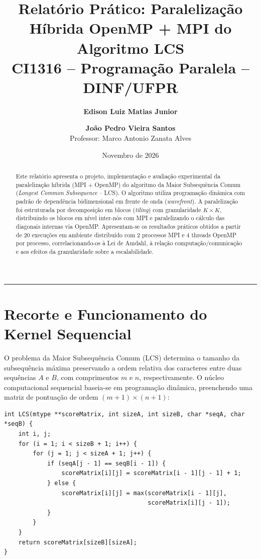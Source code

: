 \documentclass[12pt,a4paper]{article}
\title{\textbf{Relatório Prático: Paralelização Híbrida OpenMP + MPI do Algoritmo LCS}\\[0.5ex]
\large CI1316 -- Programação Paralela -- DINF/UFPR}
\author{\textbf{Edison Luiz Matias Junior} \and \textbf{João Pedro Vieira Santos}\\[1ex]
\small Professor: Marco Antonio Zanata Alves}
\date{Novembro de 2026}
\begin{document}
\maketitle

\begin{abstract}
Este relatório apresenta o projeto, implementação e avaliação experimental da paralelização híbrida (MPI + OpenMP) do algoritmo da Maior Subsequência Comum (\textit{Longest Common Subsequence} -- LCS). O algoritmo utiliza programação dinâmica com padrão de dependência bidimensional em frente de onda (\textit{wavefront}). A paralelização foi estruturada por decomposição em blocos (\textit{tiling}) com granularidade $K \times K$, distribuindo os blocos em nível inter-nós com MPI e paralelizando o cálculo das diagonais internas via OpenMP. Apresentam-se os resultados práticos obtidos a partir de 20 execuções em ambiente distribuído com 2 processos MPI e 4 threads OpenMP por processo, correlacionando-os à Lei de Amdahl, à relação computação/comunicação e aos efeitos da granularidade sobre a escalabilidade.
\end{abstract}

\vspace{0.5cm}
\hrule
\vspace{0.5cm}

\section{Recorte e Funcionamento do Kernel Sequencial}

O problema da Maior Subsequência Comum (LCS) determina o tamanho da subsequência máxima preservando a ordem relativa dos caracteres entre duas sequências $A$ e $B$, com comprimentos $m$ e $n$, respectivamente. O núcleo computacional sequencial baseia-se em programação dinâmica, preenchendo uma matriz de pontuação de ordem $(m+1) \times (n+1)$:

\begin{lstlisting}[caption={Kernel sequencial do algoritmo LCS (lcs.c).}]
int LCS(mtype **scoreMatrix, int sizeA, int sizeB, char *seqA, char *seqB) {
    int i, j;
    for (i = 1; i < sizeB + 1; i++) {
        for (j = 1; j < sizeA + 1; j++) {
            if (seqA[j - 1] == seqB[i - 1]) {
                scoreMatrix[i][j] = scoreMatrix[i - 1][j - 1] + 1;
            } else {
                scoreMatrix[i][j] = max(scoreMatrix[i - 1][j], 
                                        scoreMatrix[i][j - 1]);
            }
        }
    }
    return scoreMatrix[sizeB][sizeA];
}
\end{lstlisting}
\end{document}
